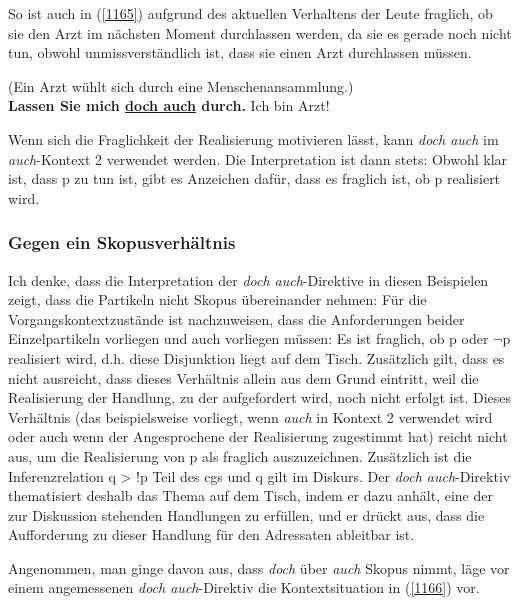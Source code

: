 So ist auch in (\ref{1165}) aufgrund des aktuellen Verhaltens der Leute fraglich, ob sie den Arzt im nächsten Moment durchlassen werden, da sie es gerade noch nicht tun, obwohl unmissverständlich ist, dass sie einen Arzt durchlassen müssen.

\begin{exe}
	\ex\label{1165} 
	(Ein Arzt wühlt sich durch eine Menschenansammlung.)\\
	\textbf{Lassen Sie mich \ul{doch auch} durch.} Ich bin Arzt!
\end{exe}
Wenn sich die Fraglichkeit der Realisierung motivieren lässt, kann \textit{doch auch} im \textit{auch}-Kontext 2 verwendet werden. Die Interpretation ist dann stets: Obwohl klar ist, dass p zu tun ist, gibt es Anzeichen dafür, dass es fraglich ist, ob p realisiert wird.
						  
\subsubsection{Gegen ein Skopusverhältnis}
Ich denke, dass die Interpretation der \textit{doch auch}-Direktive in diesen Beispielen zeigt, dass die Partikeln nicht Skopus  übereinander nehmen: Für die Vorgangskontextzustände ist nachzuweisen, dass die Anforderungen beider Einzelpartikeln vorliegen und auch vorliegen müssen: Es ist fraglich, ob p oder $\neg$p realisiert wird, d.h. diese Disjunktion liegt auf dem Tisch. Zusätzlich gilt, dass es nicht ausreicht, dass dieses Verhältnis allein aus dem Grund eintritt, weil die Realisierung der Handlung, zu der aufgefordert wird, noch nicht erfolgt ist. Dieses Verhältnis (das beispielsweise vorliegt, wenn \textit{auch} in Kontext 2 verwendet wird oder auch wenn der Angesprochene der Realisierung zugestimmt hat) reicht nicht aus, um die Realisierung von p als fraglich auszuzeichnen. Zu\-sätzlich ist die Inferenzrelation  q > !p Teil des cgs und q gilt im Diskurs. Der \textit{doch auch}-Direktiv thematisiert deshalb das Thema auf dem Tisch, indem er dazu anhält, eine der zur Diskussion stehenden Handlungen zu erfüllen, und er drückt aus, dass die Aufforderung zu dieser Handlung für den Adressaten ableitbar ist.

Angenommen, man ginge davon aus, dass \textit{doch} über \textit{auch} Skopus nimmt, läge vor einem angemessenen \textit{doch auch}-Direktiv die Kontextsituation in (\ref{1166}) vor.

